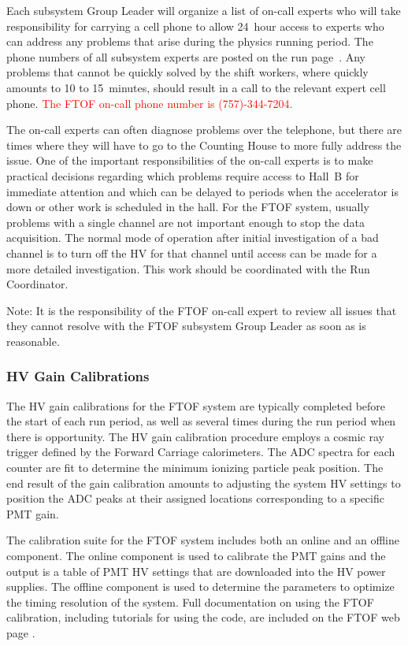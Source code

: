 \documentclass[12pt]{article}
\begin{document}
Each subsystem Group Leader will organize a list of on-call experts who will take responsibility 
for carrying a cell phone to allow 24~hour access to experts who can address any problems that 
arise during the physics running period. The phone numbers of all subsystem experts are posted on
the run page~\cite{run-page}. Any problems that cannot be quickly solved by the shift workers, 
where quickly amounts to 10 to 15~minutes, should result in a call to the relevant expert cell phone.
\textcolor{red}{The FTOF on-call phone number is (757)-344-7204.} 

The on-call experts can often diagnose problems over the telephone, but there are times where they
will have to go to the Counting House to more fully address the issue. One of the important
responsibilities of the on-call experts is to make practical decisions regarding which problems 
require access to Hall~B for immediate attention and which can be delayed to periods when the 
accelerator is down or other work is scheduled in the hall. For the FTOF system, usually problems 
with a single channel are not important enough to stop the data acquisition. The normal mode of 
operation after initial investigation of a bad channel is to turn off the HV for that channel 
until access can be made for a more detailed investigation. This work should be coordinated with
the Run Coordinator.

Note: It is the responsibility of the FTOF on-call expert to review all issues that they cannot
resolve with the FTOF subsystem Group Leader as soon as is reasonable.

\subsubsection{HV Gain Calibrations}
\label{gain-calib}

The HV gain calibrations for the FTOF system are typically completed before the start of each run
period, as well as several times during the run period when there is opportunity. The HV gain 
calibration procedure employs a cosmic ray trigger defined by the Forward Carriage calorimeters. 
The ADC spectra for each counter are fit to determine the minimum ionizing particle peak position.
The end result of the gain calibration amounts to adjusting the system HV settings to position the 
ADC peaks at their assigned locations corresponding to a specific PMT gain.

The calibration suite for the FTOF system includes both an online and an offline component. The
online component is used to calibrate the PMT gains and the output is a table of PMT HV settings
that are downloaded into the HV power supplies. The offline component is used to determine the
parameters to optimize the timing resolution of the system. Full documentation on using the
FTOF calibration, including tutorials for using the code, are included on the FTOF web page
\cite{ftof-web}.
\end{document}
